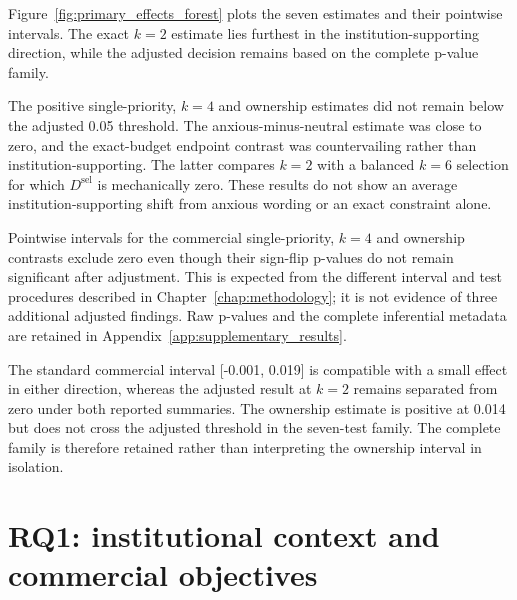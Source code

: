 \documentclass[12pt,a4paper,oneside]{report}
\newcommand{\rev}[1]{#1}
\newenvironment{revisionblock}{}{}
\begin{document}
\begin{revisionblock}
Figure~\ref{fig:primary_effects_forest} plots the seven estimates and their pointwise intervals. The exact \(k=2\) estimate lies furthest in the institution-supporting direction, while the adjusted decision remains based on the complete p-value family.

The positive single-priority, \(k=4\) and ownership estimates did not remain below the adjusted 0.05 threshold. The anxious-minus-neutral estimate was close to zero, and the exact-budget endpoint contrast was countervailing rather than institution-supporting. The latter compares \(k=2\) with a balanced \(k=6\) selection for which \(D^{\mathrm{sel}}\) is mechanically zero. These results do not show an average institution-supporting shift from anxious wording or an exact constraint alone.

Pointwise intervals for the commercial single-priority, \(k=4\) and ownership contrasts exclude zero even though their sign-flip p-values do not remain significant after adjustment. This is expected from the different interval and test procedures described in Chapter~\ref{chap:methodology}; it is not evidence of three additional adjusted findings. Raw p-values and the complete inferential metadata are retained in Appendix~\ref{app:supplementary_results}.

The standard commercial interval [-0.001, 0.019] is compatible with a small effect in either direction, whereas the adjusted result at \(k=2\) remains separated from zero under both reported summaries. The ownership estimate is positive at 0.014 but does not cross the adjusted threshold in the seven-test family. The complete family is therefore retained rather than interpreting the ownership interval in isolation.
\end{revisionblock}

\section[RQ1: institutional context and commercial objectives]{\rev{RQ1: institutional context and commercial objectives}}
\end{document}
